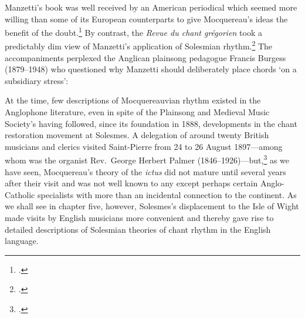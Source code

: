 Manzetti's book was well received by an American periodical which seemed more willing than some of its European counterparts to give Mocquereau's ideas the benefit of the doubt.\footcite[571]{PublicationsReviewedManzetti1906}
By contrast, the \emph{Revue du chant grégorien} took a predictably dim view of Manzetti's application of Solesmian rhythm.\footcite[30--31]{Bibliographiegregorienneeditions1906b}
%
The accompaniments perplexed the Anglican plainsong pedagogue Francis Burgess (1879--1948) who questioned why Manzetti should deliberately place chords `on a subsidiary stress':
\pagebreak{}

  {\cite[80]{BurgessTeachingAccompanimentPlainsong1914}}
\noindent
At the time, few descriptions of Mocquereauvian rhythm existed in the Anglophone literature, even in spite of the Plainsong and Medieval Music Society's having followed, since its foundation in 1888, developments in the chant restoration movement at Solesmes.
A delegation of around twenty British musicians and clerics visited Saint-Pierre from 24 to 26 August 1897---among whom was the organist Rev.~George Herbert Palmer (1846--1926)---but,\footcite[164]{Halarestaurationplainchantdans2016} as we have seen, Mocquereau's theory of the \emph{ictus} did not mature until several years after their visit and was not well known to any except perhaps certain Anglo-Catholic specialists with more than an incidental connection to the continent.
As we shall see in chapter five, however, Solesmes's displacement to the Isle of Wight made visits by English musicians more convenient and thereby gave rise to detailed descriptions of Solesmian theories of chant rhythm in the English language.

